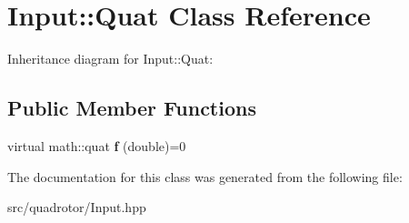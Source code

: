 \hypertarget{classInput_1_1Quat}{
\section{Input::Quat Class Reference}
\label{classInput_1_1Quat}
}
Inheritance diagram for Input::Quat:\subsection*{Public Member Functions}
\begin{DoxyCompactItemize}
\item 
\hypertarget{classInput_1_1Quat_a49bc92df827442db4de31b80928b4b86}{
virtual math::quat {\bfseries f} (double)=0}
\label{classInput_1_1Quat_a49bc92df827442db4de31b80928b4b86}

\end{DoxyCompactItemize}


The documentation for this class was generated from the following file:\begin{DoxyCompactItemize}
\item 
src/quadrotor/Input.hpp\end{DoxyCompactItemize}
